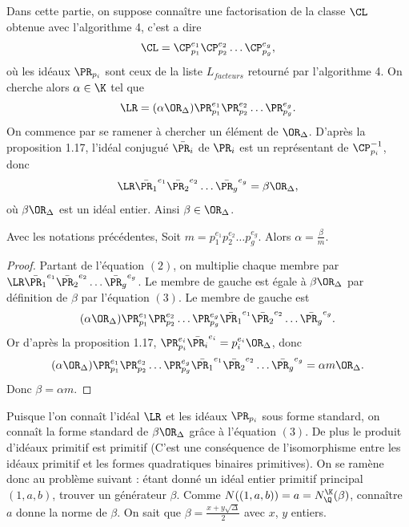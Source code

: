 Dans cette partie, on suppose connaître une factorisation de la classe $\CL$ obtenue avec l'algorithme 4, c'est a dire
\begin{equation}
	\CL = \CP_{p_{1}}^{e_{1}}\CP_{p_{2}}^{e_{2}}\ldots\CP_{p_{g}}^{e_{g}},
\end{equation}
où les idéaux $\PR_{p_{i}}$ sont ceux de la liste $L_{facteurs}$ retourné par l'algorithme 4. On cherche alors $\alpha\in\K$ tel que 
\begin{equation}
	\LR = (\alpha\OR_{\Delta})\PR_{p_{1}}^{e_{1}}\PR_{p_{2}}^{e_{2}}\ldots\PR_{p_{g}}^{e_{g}}.
\end{equation}
On commence par se ramener à chercher un élément de $\OR_{\Delta}$. D'après la proposition 1.17, l'idéal conjugué $\bar{\PR_{i}}$ de $\PR_{i}$ est un représentant de $\CP_{p_{i}}^{-1}$, donc
\begin{equation}
	\LR\bar{\PR_{1}}^{e_{1}}\bar{\PR_{2}}^{e_{2}}\ldots\bar{\PR_{g}}^{e_{g}} = \beta\OR_{\Delta},
\end{equation}
où $\beta\OR_{\Delta}$ est un idéal entier. Ainsi $\beta\in\OR_{\Delta}$.

\begin{Prop}
	Avec les notations précédentes, Soit $m = p_{1}^{e_{1}}p_{2}^{e_{2}}\ldots p_{g}^{e_{g}}$. Alors $\alpha = \frac{\beta}{m}$.
\end{Prop}

\begin{proof}
	Partant de l'équation $(2)$, on multiplie chaque membre par $\LR\bar{\PR_{1}}^{e_{1}}\bar{\PR_{2}}^{e_{2}}\ldots\bar{\PR_{g}}^{e_{g}}$. Le membre de gauche est égale à $\beta\OR_{\Delta}$ par définition de $\beta$ par l'équation $(3)$. Le membre de gauche est
	\begin{equation*}
		(\alpha\OR_{\Delta})\PR_{p_{1}}^{e_{1}}\PR_{p_{2}}^{e_{2}}\ldots\PR_{p_{g}}^{e_{g}}\bar{\PR_{1}}^{e_{1}}\bar{\PR_{2}}^{e_{2}}\ldots\bar{\PR_{g}}^{e_{g}}.
	\end{equation*}
	Or d'après la proposition 1.17, $\PR_{p_{i}}^{e_{i}}\bar{\PR_{i}}^{e_{i}} = p_{i}^{e_{i}}\OR_{\Delta}$, donc 
	\begin{equation*}
		(\alpha\OR_{\Delta})\PR_{p_{1}}^{e_{1}}\PR_{p_{2}}^{e_{2}}\ldots\PR_{p_{g}}^{e_{g}}\bar{\PR_{1}}^{e_{1}}\bar{\PR_{2}}^{e_{2}}\ldots\bar{\PR_{g}}^{e_{g}} = \alpha m\OR_{\Delta}.
	\end{equation*}
	Donc $\beta = \alpha m$.
\end{proof}

Puisque l'on connaît l'idéal $\LR$ et les idéaux $\PR_{p_{i}}$ sous forme standard, on connaît la forme standard de $\beta\OR_{\Delta}$ grâce à l'équation $(3)$. De plus le produit d'idéaux primitif est primitif (C'est une conséquence de l'isomorphisme entre les idéaux primitif et les formes quadratiques binaires primitives). On se ramène donc au problème suivant : étant donné un idéal entier primitif principal $(1,a,b)$, trouver un générateur $\beta$. Comme $N((1,a,b)) = a = N_{\Q}^{\K}(\beta)$, connaître $a$ donne la norme de $\beta$. On sait que $\beta = \frac{x + y \sqrt{\Delta}}{2}$ avec $x$, $y$ entiers.

